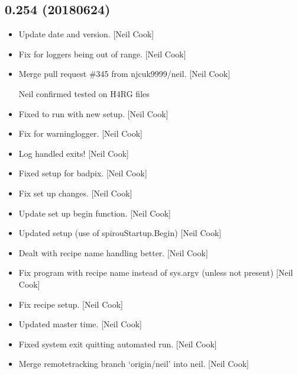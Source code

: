 \documentclass[a4paper,10pt,english]{report}
\begin{document}
\subsection{0.254 (2018\sphinxhyphen{}06\sphinxhyphen{}24)}
\label{\detokenize{misc/changelog:id431}}\begin{itemize}
\item {} 
Update date and version. {[}Neil Cook{]}

\item {} 
Fix for loggers being out of range. {[}Neil Cook{]}

\item {} 
Merge pull request \#345 from njcuk9999/neil. {[}Neil Cook{]}

Neil \sphinxhyphen{} confirmed tested on H4RG files

\item {} 
Fixed to run with new setup. {[}Neil Cook{]}

\item {} 
Fix for warninglogger. {[}Neil Cook{]}

\item {} 
Log handled exits! {[}Neil Cook{]}

\item {} 
Fixed setup for badpix. {[}Neil Cook{]}

\item {} 
Fix set up changes. {[}Neil Cook{]}

\item {} 
Update set up begin function. {[}Neil Cook{]}

\item {} 
Updated setup (use of spirouStartup.Begin) {[}Neil Cook{]}

\item {} 
Dealt with recipe name handling better. {[}Neil Cook{]}

\item {} 
Fix program with recipe name instead of sys.argv (unless not present)
{[}Neil Cook{]}

\item {} 
Fix recipe setup. {[}Neil Cook{]}

\item {} 
Updated master time. {[}Neil Cook{]}

\item {} 
Fixed system exit quitting automated run. {[}Neil Cook{]}

\item {} 
Merge remote\sphinxhyphen{}tracking branch ‘origin/neil’ into neil. {[}Neil Cook{]}


\end{itemize}
\end{document}
